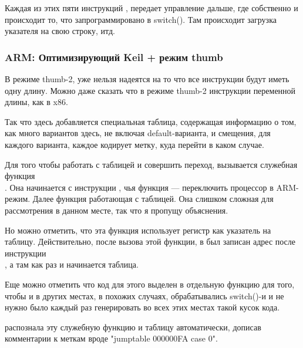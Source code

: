 Каждая из этих пяти инструкций , передает управление дальше, где собственно и происходит то, 
что запрограммировано в switch(). Там происходит загрузка указателя на свою строку, итд.

\subsubsection{ARM: Оптимизирующий Keil + режим thumb}



В режиме thumb-2, уже нельзя надеятся на то что все инструкции будут иметь одну длину. 
Можно даже сказать что в режиме thumb-2 инструкции переменной длины, как в x86.

Так что здесь добавляется специальная таблица, содержащая информацию о том, как много вариантов здесь,
не включая default-варианта, и смещения, для каждого варианта, каждое кодирует метку, куда перейти в 
каком случае.

Для того чтобы работать с таблицей и совершить переход, вызывается служебная функция \\
. Она начинается с инструкции , чья функция --- 
переключить процессор в ARM-режим. Далее функция работающая с таблицей. Она слишком сложная для 
рассмотрения в данном месте, так что я пропущу объяснения.

Но можно отметить, что эта функция использует
регистр \LR как указатель на таблицу. Действительно, после вызова этой функции, в \LR был записан
адрес после инструкции \\ 
, а там как раз и начинается таблица.

Еще можно отметить что код для этого выделен в отдельную функцию для того, чтобы и в других местах,
в похожих случаях, обрабатывались switch()-и и не нужно было каждый раз генерировать во всех этих
местах такой кусок кода.

\IDA распознала эту служебную функцию и таблицу автоматически, 
дописав комментарии к меткам вроде "jumptable 000000FA case 0".
